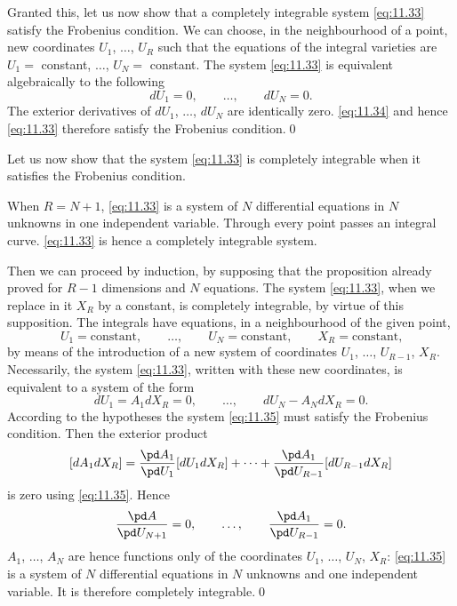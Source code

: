 Granted this, let us now show that a completely integrable system \eqref{eq:11.33} satisfy the Frobenius condition. We can choose, in the neighbourhood of a point, new coordinates $U_{1}$, $\dots$, $U_{R}$ such that the equations of the integral varieties are $U_{1}=$ constant, $\dots$, $U_{N}=$ constant. The system \eqref{eq:11.33} is equivalent algebraically to the following
\begin{equation}
  \label{eq:11.34}
  dU_{1}=0,\qquad\dots,\qquad dU_{N}=0.
\end{equation}
The exterior derivatives of $dU_{1}$, $\dots$, $dU_{N}$ are identically zero. \eqref{eq:11.34} and hence \eqref{eq:11.33} therefore satisfy the Frobenius condition.\qed

\somespace

Let us now show that the system \eqref{eq:11.33} is completely integrable when it satisfies the Frobenius condition.

When $R=N+1$, \eqref{eq:11.33} is a system of $N$ differential equations in $N$ unknowns in one independent variable. Through every point passes an integral curve. \eqref{eq:11.33} is hence a completely integrable system.

Then we can proceed by induction, by supposing that the proposition already proved for $R-1$ dimensions and $N$ equations. The system \eqref{eq:11.33}, when we replace in it $X_{R}$ by a constant, is completely integrable, by virtue of this supposition. The integrals have equations, in a neighbourhood of the given point,
\[
U_{1}=\text{constant}, \qquad\dots,\qquad U_{N}=\text{constant},\qquad X_{R}=\text{constant,}
\]
by means of the introduction of a new system of coordinates $U_{1}$, $\dots$, $U_{R-1}$, $X_{R}$. Necessarily, the system \eqref{eq:11.33}, written with these new coordinates, is equivalent to a system of the form
\begin{equation}
  \label{eq:11.35}
  dU_{1}=A_{1}dX_{R}=0,\qquad\dots,\qquad dU_{N}-A_{N}dX_{R}=0.
\end{equation}
According to the hypotheses the system \eqref{eq:11.35} must satisfy the Frobenius condition. Then the exterior product
\[
[dA_{1}dX_{R}]=\frac{\pd A_{1}}{\pd U_{1}}[dU_{1}dX_{R}]+\dots+\frac{\pd A_{1}}{\pd U_{R-1}}[dU_{R-1}dX_{R}]
\]
is zero using \eqref{eq:11.35}. Hence
\[
\frac{\pd A}{\pd U_{N+1}}=0,\qquad\dots,\qquad\frac{\pd A_{1}}{\pd U_{R-1}}=0.
\]
$A_{1}$, $\dots$, $A_{N}$ are hence functions only of the coordinates $U_{1}$, $\dots$, $U_{N}$, $X_{R}$: \eqref{eq:11.35} is a system of $N$ differential equations in $N$ unknowns and one independent variable. It is therefore completely integrable.\qed

